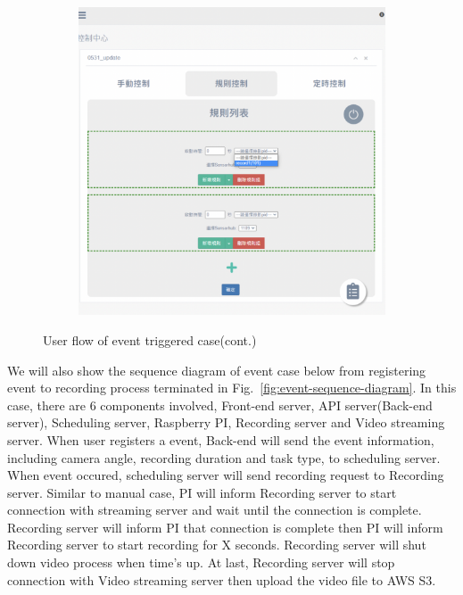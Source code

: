 \begin{figure}[H]
    \ContinuedFloat
    \centering
    \begin{subfigure}{\textwidth}
        \includegraphics[width=\textwidth]{figsrc/event-userflow-c.png}
        \label{fig:event-userflow-c}
    \end{subfigure}

    \caption{User flow of event triggered case(cont.)}
    \label{fig:event-userflow}
\end{figure}

We will also show the sequence diagram of event case below from registering event to recording process terminated in Fig.~\ref{fig:event-sequence-diagram}. In this case, there are 6 components involved, Front-end server, API server(Back-end server), Scheduling server, Raspberry PI, Recording server and Video streaming server. When user registers a event, Back-end will send the event information, including camera angle, recording duration and task type, to scheduling server. When event occured, scheduling server will send recording request to Recording server. Similar to manual case, PI will inform Recording server to start connection with streaming server and wait until the connection is complete. Recording server will inform PI that connection is complete then PI will inform Recording server to start recording for X seconds. Recording server will shut down video process when time's up. At last, Recording server will stop connection with Video streaming server then upload the video file to AWS S3.

